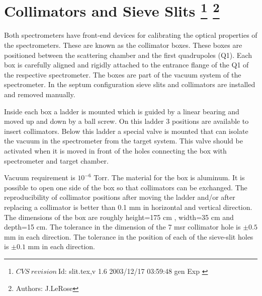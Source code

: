 \section[Collimators and Sieve Slits]{Collimators and Sieve Slits
\footnote{
  $CVS~revision~ $Id: slit.tex,v 1.6 2003/12/17 03:59:48 gen Exp $ $ 
}
\footnote{Authors: J.LeRose }
}

Both spectrometers have front-end devices for calibrating the optical
properties of the spectrometers. These are known as the collimator boxes.
These boxes are positioned between the scattering chamber and the 
first quadrupoles (Q1). Each box is carefully aligned and rigidly attached
to the  entrance flange of the Q1 of the respective spectrometer.  The boxes are
part of the vacuum system of the spectrometer.
In the septum configuration sieve slits and collimators are installed and removed manually.

Inside each box a ladder is mounted which is guided by a linear bearing
and moved up and down by a ball screw. On this ladder 3 positions are 
available to insert collimators. Below this ladder
a special valve is mounted that can isolate the vacuum in the spectrometer
from the target system. This valve should be activated when it is moved
in front of the holes connecting the box with spectrometer and target chamber.

Vacuum requirement is $10^{-6}$ Torr. The material for the box is 
aluminum. It is possible to open one side of the box so that
collimators can be exchanged. The
reproducibility of collimator positions after moving
the ladder and/or after replacing a collimator is
better than 0.1 mm in horizontal and vertical direction.
The dimensions of the box are
roughly height=175 cm , width=35 cm and depth=15 cm.
The tolerance in the dimension
of the 7 msr collimator hole is $\pm0.5$ mm in each direction. 
The tolerance in the position
of each of the sieve-slit holes is $\pm0.1$ mm in each direction.

